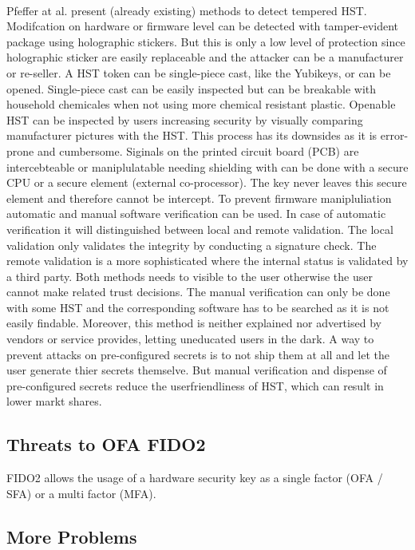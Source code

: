 \documentclass[runningheads]{llncs}
\begin{document}
\paragraph{}
Pfeffer at al. present (already existing) methods to detect tempered HST.
Modifcation on hardware or firmware level can be detected with tamper-evident package using holographic stickers. But this is only a low level of protection since holographic sticker are easily replaceable and the attacker can be a manufacturer or re-seller. A HST token can be single-piece cast, like the Yubikeys, or can be opened. Single-piece cast can be easily inspected but can be breakable with household chemicales when not using more chemical resistant plastic. Openable HST can be inspected by users increasing security by visually comparing manufacturer pictures with the HST. This process has its downsides as it is error-prone and cumbersome. Siginals on the printed circuit board (PCB) are intercebteable or maniplulatable needing shielding with can be done with a secure CPU or a secure element (external co-processor). The key never leaves this secure element and therefore cannot be intercept. To prevent firmware manipluliation automatic and manual software verification can be used. In case of automatic verification it will distinguished between local and remote validation. The local validation only validates the integrity by conducting a signature check. The remote validation is a more sophisticated where the internal status is validated by a third party. Both methods needs to visible to the user otherwise the user cannot make related trust decisions.
The manual verification can only be done with some HST and the corresponding software has to be searched as it is not easily findable. Moreover, this method is neither explained nor advertised by vendors or service provides, letting uneducated users in the dark. A way to prevent attacks on pre-configured secrets is to not ship them at all and let the user generate thier secrets themselve. But manual verification and dispense of pre-configured secrets reduce the userfriendliness of HST, which can result in lower markt shares. \cite{272198}

\subsection{Threats to OFA FIDO2}
FIDO2 allows the usage of a hardware security key as a single factor (OFA / SFA) or a multi factor (MFA).


\subsection{More Problems}
\end{document}

